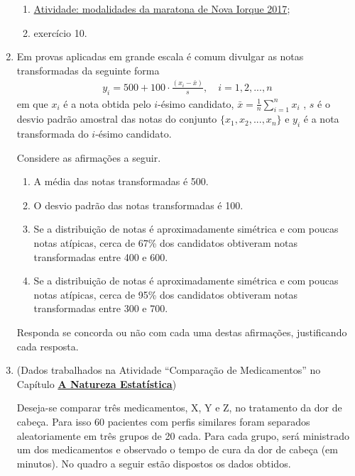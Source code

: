 \begin{enumerate}
\begin{enumerate}
\item {} 
\hyperref[\detokenize{PE104-7:ativ-comparacaodegruposusandoboxplot}]{Atividade: modalidades da maratona de Nova Iorque 2017};

\item {} 
exercício 10.

\end{enumerate}

\item Em provas aplicadas em grande escala é comum divulgar as notas transformadas da seguinte forma
\begin{equation*}
\begin{split}y_i = 500+100\cdot \frac{(x_i-\bar{x})}{s}, \quad i=1,2,...,n\end{split}
\end{equation*}
em que \(x_i\) é a nota obtida pelo \(i\)-ésimo candidato, \(\bar{x}=\frac{1}{n}\displaystyle{\sum^n_{i=1}}x_i\) , \(s\) é o desvio padrão amostral das notas do conjunto \(\{ x_1,x_2, ..., x_n\}\) e \(y_i\) é a nota transformada do \(i\)-ésimo candidato.

Considere as afirmações a seguir.
\begin{enumerate}
\item {} 
A média das notas transformadas é 500.

\item {} 
O desvio padrão das notas transformadas é 100.

\item {} 
Se a distribuição de notas é aproximadamente simétrica e com poucas notas atípicas, cerca de 67\% dos candidatos obtiveram notas transformadas entre 400 e 600.

\item {} 
Se a distribuição de notas é aproximadamente simétrica e com poucas notas atípicas, cerca de 95\% dos candidatos obtiveram notas transformadas entre 300 e 700.

\end{enumerate}

Responda se concorda ou não com cada uma destas afirmações, justificando cada resposta.

\item (Dados trabalhados na Atividade “Comparação de Medicamentos” no Capítulo \textbf{\hyperref[est1-chap]{A Natureza Estatística}})

Deseja-se comparar três medicamentos, X, Y e Z, no tratamento da dor de cabeça. Para isso 60 pacientes com perfis similares foram separados aleatoriamente em três grupos de 20 cada. Para cada grupo,  será ministrado um dos medicamentos e observado o tempo de cura da dor de cabeça (em minutos). No quadro a seguir estão dispostos os dados obtidos.


\end{enumerate}
